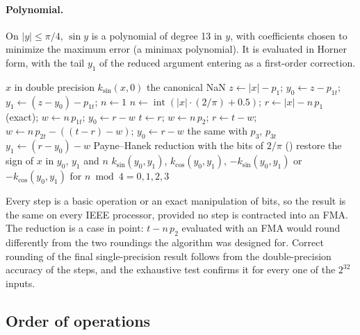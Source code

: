 \paragraph{Polynomial.} On $|y| \le \pi/4$, $\sin y$ is a polynomial of degree 13 in $y$, with coefficients
chosen to minimize the maximum error (a minimax polynomial). It is evaluated in Horner form, with the tail $y_1$ of
the reduced argument entering as a first-order correction.

\begin{algorithm}[ht]
\caption{The portable sine (, , ; double precision). For ,
 converts $x$ to double, calls this, and rounds once to single.}
\label{alg:rp-sin}
\begin{algorithmic}[1]
\Require $x$ in double precision
 \Return $k_{\sin}(x, 0)$ \EndIf
{} \Return the canonical NaN \EndIf
{} 
  \State $z \gets |x| - p_1$; \quad $y_0 \gets z - p_{1t}$; \quad $y_1 \gets (z - y_0) - p_{1t}$; \quad $n \gets 1$
 
  \State $n \gets \operatorname{int}(|x|\cdot(2/\pi) + 0.5)$; \quad $r \gets |x| - n\,p_1$ (exact); \quad
    $w \gets n\,p_{1t}$; \quad $y_0 \gets r - w$
    \State $t \gets r$; $w \gets n\,p_2$; $r \gets t - w$; $w \gets n\,p_{2t} - ((t - r) - w)$; $y_0 \gets r - w$
     \State the same with $p_3$, $p_{3t}$ \EndIf
  \EndIf
  \State $y_1 \gets (r - y_0) - w$
\Else
  \State Payne--Hanek reduction with the bits of $2/\pi$ ()
\EndIf
\State restore the sign of $x$ in $y_0$, $y_1$ and $n$
\State \Return $k_{\sin}(y_0, y_1)$, $k_{\cos}(y_0, y_1)$, $-k_{\sin}(y_0,y_1)$ or $-k_{\cos}(y_0,y_1)$ for
  $n \bmod 4 = 0, 1, 2, 3$
\end{algorithmic}
\end{algorithm}

Every step is a basic operation or an exact manipulation of bits, so the result is the same on every IEEE processor,
provided no step is contracted into an FMA. The reduction is a case in point: $t - n\,p_2$ evaluated with an FMA
would round differently from the two roundings the algorithm was designed for. Correct rounding of the final
single-precision result follows from the double-precision accuracy of the steps, and the exhaustive test confirms it
for every one of the $2^{32}$ inputs.

\subsection{Order of operations}

